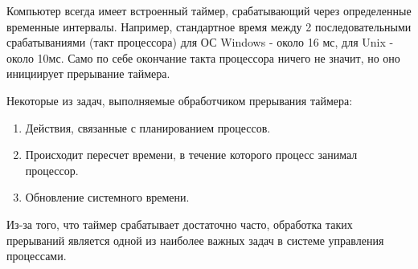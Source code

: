 Компьютер всегда имеет встроенный таймер, срабатывающий через определенные временные интервалы. Например, стандартное время между 2 последовательными срабатываниями (такт процессора) для ОС Windows - около 16 мс, для Unix - около 10мс. Само по себе окончание такта процессора ничего не значит, но оно инициирует прерывание таймера.

\label{interruption:timer}Некоторые из задач, выполняемые обработчиком прерывания таймера:
\begin{enumerate}[label=---]
\item Действия, связанные с планированием процессов.
\item Происходит пересчет времени, в течение которого процесс занимал процессор.
\item Обновление системного времени.
\end{enumerate}
Из-за того, что таймер срабатывает достаточно часто, обработка таких прерываний является одной из наиболее важных задач в системе управления процессами.\\

